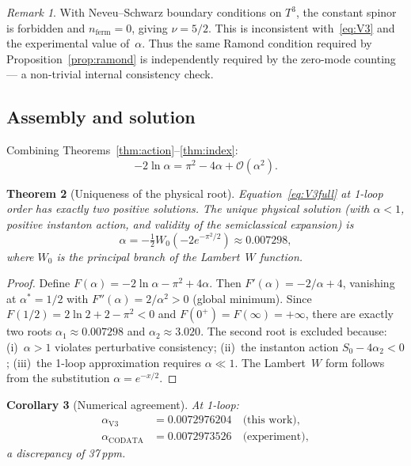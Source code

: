 \documentclass[11pt,a4paper]{article}
\newtheorem{theorem}{Theorem}
\newtheorem{corollary}[theorem]{Corollary}
\theoremstyle{definition}
\theoremstyle{remark}
\newtheorem{remark}[theorem]{Remark}
\begin{document}
\begin{remark}
With Neveu--Schwarz boundary conditions on $T^3$, the constant spinor is
forbidden and $n_{\mathrm{ferm}}=0$, giving $\nu=5/2$.  This is
inconsistent with~\eqref{eq:V3} and the experimental value of~$\alpha$.
Thus the same Ramond condition required by Proposition~\ref{prop:ramond}
is independently required by the zero-mode counting --- a non-trivial
internal consistency check.
\end{remark}

\subsection{Assembly and solution}

Combining Theorems~\ref{thm:action}--\ref{thm:index}:
\begin{equation}\label{eq:V3full}
  \boxed{-2\ln\alpha = \pi^2 - 4\alpha + \mathcal{O}(\alpha^2).}
\end{equation}

\begin{theorem}[Uniqueness of the physical root]\label{thm:unique}
Equation~\eqref{eq:V3full} at 1-loop order has exactly two positive
solutions.  The unique physical solution (with $\alpha<1$, positive
instanton action, and validity of the semiclassical expansion) is
\begin{equation}
  \alpha = -\tfrac12 W_0\!\left(-2e^{-\pi^2/2}\right)\approx 0.007298,
\end{equation}
where $W_0$ is the principal branch of the Lambert~$W$ function.
\end{theorem}

\begin{proof}
Define $F(\alpha)=-2\ln\alpha-\pi^2+4\alpha$.  Then
$F'(\alpha)=-2/\alpha+4$, vanishing at $\alpha^*=1/2$ with
$F''(\alpha)=2/\alpha^2>0$ (global minimum).  Since $F(1/2)=2\ln 2+2-\pi^2<0$
and $F(0^+)=F(\infty)=+\infty$, there are exactly two roots
$\alpha_1\approx 0.007298$ and $\alpha_2\approx 3.020$.  The second root is
excluded because: (i)~$\alpha>1$ violates perturbative consistency;
(ii)~the instanton action $S_0-4\alpha_2<0$; (iii)~the 1-loop
approximation requires $\alpha\ll 1$.  The Lambert~$W$ form follows from
the substitution $\alpha=e^{-x/2}$.
\end{proof}

\begin{corollary}[Numerical agreement]\label{cor:numerical}
At 1-loop:
\begin{align}
  \alpha_{\mathrm{V3}} &= 0.0072976204 \quad\text{(this work)},\\
  \alpha_{\mathrm{CODATA}} &= 0.0072973526 \quad\text{(experiment)},
\end{align}
a discrepancy of 37\,ppm.
\end{corollary}
\end{document}

